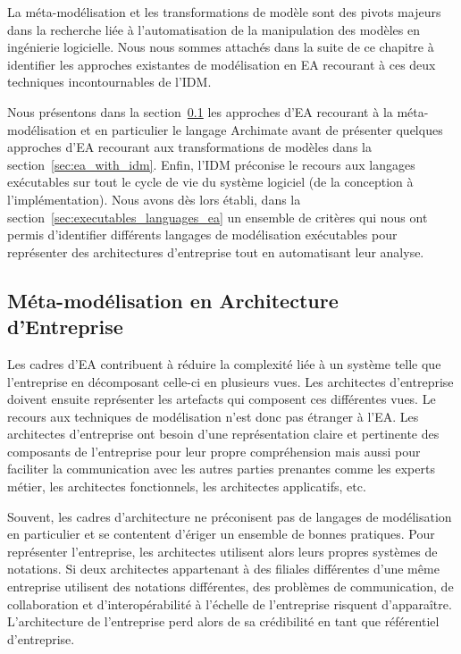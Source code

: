 La méta-modélisation et les transformations de modèle sont des pivots majeurs dans la recherche
liée à l'automatisation de la manipulation des modèles en ingénierie logicielle. Nous nous sommes attachés
dans la suite de ce chapitre à identifier les approches existantes de modélisation en EA recourant à ces
deux techniques incontournables de l'IDM. 

Nous présentons dans la section~\ref{sec:metamodelisation_ea} les approches d'EA recourant à la méta-modélisation
et en particulier le langage Archimate avant de présenter quelques approches d'EA recourant aux transformations
de modèles dans la section~\ref{sec:ea_with_idm}. Enfin, l'IDM préconise le recours aux langages exécutables sur
tout le cycle de vie du système logiciel (de la conception à l'implémentation). Nous avons dès lors établi,
dans la section~\ref{sec:executables_languages_ea} un ensemble de critères qui nous ont permis d'identifier différents langages
de modélisation exécutables pour représenter des architectures d'entreprise 
tout en automatisant leur analyse.



\subsection{Méta-modélisation en Architecture d'Entreprise}
\label{sec:metamodelisation_ea}

Les cadres d'EA contribuent à réduire la complexité liée à un système telle que l'entreprise en décomposant celle-ci en plusieurs vues. Les architectes d'entreprise doivent ensuite représenter les artefacts qui composent ces différentes vues. Le recours aux techniques de modélisation n'est donc pas étranger à l'EA. Les architectes d'entreprise ont besoin d'une représentation claire et pertinente des composants de l'entreprise pour leur propre compréhension mais aussi pour faciliter la communication avec les autres parties prenantes comme les experts métier, les architectes fonctionnels, les architectes applicatifs, etc. 

Souvent, les cadres d'architecture ne préconisent pas de langages de modélisation en particulier et se contentent d'ériger un ensemble de bonnes pratiques. Pour représenter l'entreprise, les architectes utilisent alors leurs propres systèmes de notations. Si deux architectes appartenant à des filiales différentes d'une même entreprise utilisent des notations différentes, des problèmes de communication, de collaboration et d'interopérabilité à l'échelle de l'entreprise risquent d'apparaître. L'architecture de l'entreprise perd alors de sa crédibilité en tant que référentiel d'entreprise.

